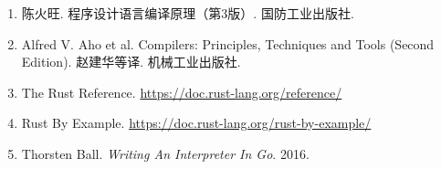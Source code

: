 \documentclass[12pt,a4paper]{ctexart}
\begin{document}
\begin{enumerate}
    \item 陈火旺. 程序设计语言编译原理（第3版）. 国防工业出版社.
    \item Alfred V. Aho et al. Compilers: Principles, Techniques and Tools (Second Edition). 赵建华等译. 机械工业出版社.
    \item The Rust Reference. \url{https://doc.rust-lang.org/reference/}
    \item Rust By Example. \url{https://doc.rust-lang.org/rust-by-example/}
    \item Thorsten Ball. \textit{Writing An Interpreter In Go}. 2016.
\end{enumerate}
\end{document}
